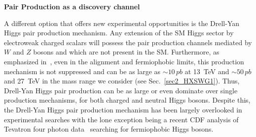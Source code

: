 \documentclass[../report.tex]{subfiles}
\begin{document}
{\bf{Pair Production as a discovery channel}}\label{sec:pair}

A different option that offers new experimental opportunities is
  the Drell-Yan Higgs pair production mechanism. Any extension of the SM Higgs sector by electroweak charged scalars will possess the pair production channels mediated by $W$ and $Z$ bosons and which are not present in the SM. Furthermore, as emphasized in~\cite{Akeroyd:2003bt,Akeroyd:2003xi,Akeroyd:2003jp,Ilisie:2014hea,Delgado:2016arn,Vega:2018ddp}, even in the alignment and fermiophobic limits, this production mechanism is not suppressed and can be as large as $\sim 10\,pb$ at 13~TeV and $\sim 50\,pb$ and 27~TeV in the mass range we consider (see Sec.~\ref{sec2_HXSWG1}). Thus, Drell-Yan Higgs pair production can be as large or even dominate over single  production mechanisms, for both charged and neutral Higgs bosons. Despite this, the Drell-Yan Higgs pair production mechanism has been largely overlooked in experimental searches with the lone exception being a recent CDF analysis of Tevatron four photon data~\cite{Aaltonen:2016fnw} searching for fermiophobic Higgs bosons.  
\end{document}
